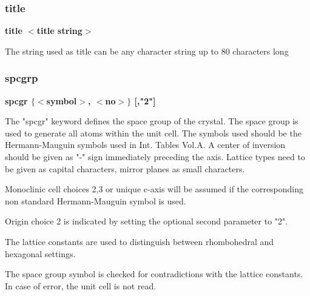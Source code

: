 \subsubsection{title}
{\bf title $ <$title string$> $ \par }
\vspace{3pt}
The string used as title can be any character string up to 80 characters 
long 
\subsubsection{spcgrp}
{\bf spcgr $ \{$$ <$symbol$> $, $ <$no$> $$\} $ [,"2"] \par }
\par
\vspace{3pt}
The "spcgr" keyword defines the space group of the crystal. 
The space group is used to generate all atoms within the unit 
cell. The symbols used should be the Hermann-Mauguin symbols used in 
Int. Tables Vol.A. A center of inversion should be given as "-" sign 
immediately preceding the axis. Lattice types need to be given as 
capital characters, mirror planes as small characters. 
\par
Monoclinic cell choices 2,3 or unique c-axis will be assumed if the 
corresponding non standard Hermann-Mauguin symbol is used. 
\par
Origin choice 2 is indicated by setting the optional second parameter 
to "2". 
\par
The lattice constants are used to distinguish between rhombohedral 
and hexagonal settings. 
\par
The space group symbol is checked for contradictions with the lattice 
constants. In case of error, the unit cell is not read. 
